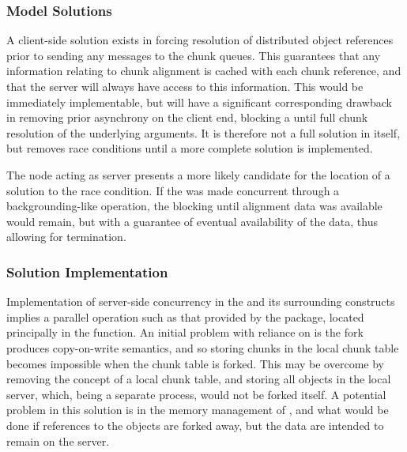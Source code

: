 
\subsubsection{Model Solutions}

A client-side solution exists in forcing resolution of distributed object references prior to sending any messages to the chunk queues.
This guarantees that any information relating to chunk alignment is cached with each chunk reference, and that the server will always have access to this information.
This would be immediately implementable, but will have a significant corresponding drawback in removing prior asynchrony on the client end, blocking a  until full chunk resolution of the underlying arguments.
It is therefore not a full solution in itself, but removes race conditions until a more complete solution is implemented.

The node acting as server presents a more likely candidate for the location of a solution to the race condition.
If the  was made concurrent through a backgrounding-like operation, the blocking until alignment data was available would remain, but with a guarantee of eventual availability of the data, thus allowing for termination.

\subsubsection{Solution Implementation}

Implementation of server-side concurrency in the  and its surrounding constructs implies a parallel operation such as that provided by the  package, located principally in the  function.
An initial problem with reliance on  is the fork produces copy-on-write semantics, and so storing chunks in the local chunk table becomes impossible when the chunk table is forked.
This may be overcome by removing the concept of a local chunk table, and storing all objects in the local  server, which, being a separate process, would not be forked itself.
A potential problem in this solution is in the memory management of , and what would be done if references to the \R{} objects are forked away, but the data are intended to remain on the server.

